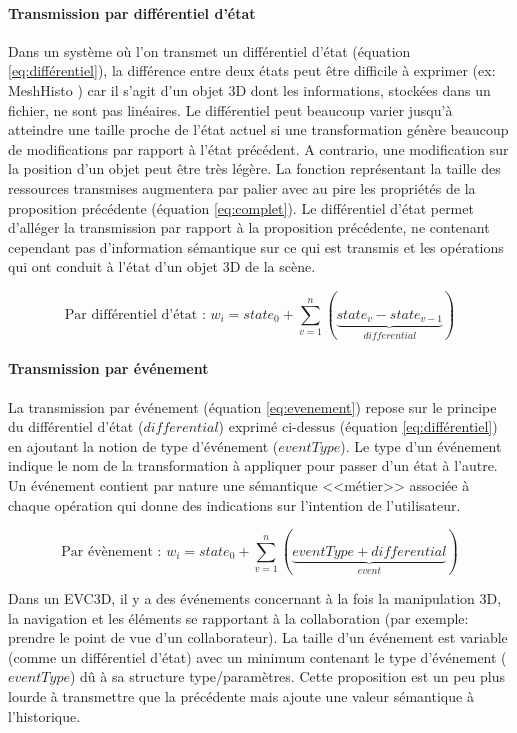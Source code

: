 \paragraph{Transmission par différentiel d'état}
\label{par:diff}
Dans un système où l'on transmet un différentiel d'état (équation 
\ref{eq:différentiel}), la différence entre deux états peut être difficile à exprimer (ex: 
MeshHisto \cite{Salvati2015})
car il s'agit d'un objet 3D dont les informations, stockées dans 
un fichier, ne sont pas linéaires. Le différentiel peut beaucoup varier jusqu'à 
atteindre une taille proche de l'état actuel si une transformation génère beaucoup 
de modifications par rapport à l'état précédent. A contrario, une modification sur la 
position d'un objet peut être très légère. La fonction représentant la taille des 
ressources transmises augmentera par palier avec au pire les propriétés de la 
proposition précédente (équation \ref{eq:complet}). Le différentiel d'état permet 
d'alléger la transmission par rapport à la proposition précédente, ne contenant 
cependant pas d'information sémantique sur ce qui est transmis et les opérations 
qui ont conduit à l'état d'un objet 3D de la scène.

\begin{equation}
\label{eq:différentiel}
\text{Par différentiel d'état : } w_i = state_0 + \sum_{v=1}^{n}(\underbrace{state_{v} 
- state_{v-1}}_{differential})
\end{equation}

\paragraph{Transmission par événement}
La transmission par événement (équation \ref{eq:evenement}) repose sur le 
principe du différentiel d'état ($differential$) exprimé ci-dessus (équation 
\ref{eq:différentiel}) en ajoutant la notion de type d'événement ($eventType$). Le 
type d'un événement indique le nom de la transformation à appliquer pour passer 
d'un état à l'autre. Un événement contient par nature une sémantique <<métier>> 
associée à chaque opération qui donne des indications sur l'intention de 
l'utilisateur. 

\begin{equation}
\label{eq:evenement}
\text{Par évènement : } w_i= state_0 + \sum_{v=1}^{n}(\underbrace{eventType + 
differential}_{event}) 
\end{equation}

Dans un \gls{EVC3D}, il y a des événements concernant à la fois la manipulation 
3D, la navigation et les éléments se rapportant à la collaboration (par exemple: 
prendre le point de vue d'un collaborateur). La taille d'un événement est variable 
(comme un différentiel d'état) avec un minimum contenant le type d'événement 
($eventType$) dû à sa structure type/paramètres. Cette proposition est un peu 
plus lourde à transmettre que la précédente mais ajoute une valeur sémantique à 
l'historique.
